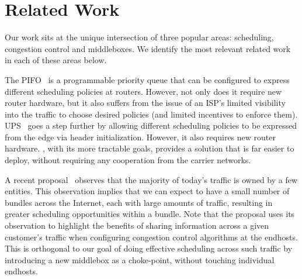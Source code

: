 \section{Related Work}
\label{s:related}

Our work sits at the unique intersection of three popular areas: scheduling, congestion control and middleboxes. We identify the most relevant related work in each of these areas below. 

 The PIFO~\cite{pifo} is a programmable priority queue that can be configured to express different scheduling policies at routers.  However, not only does it require new router hardware, but it also suffers from the issue of an ISP's limited visibility into the traffic to choose desired policies (and limited incentives to enforce them). UPS~\cite{ups} goes a step further by allowing different scheduling policies to be expressed from the edge via header initialization. 
However, it also requires new router hardware. \name, with its more tractable goals, provides a solution that is far easier to deploy, without requiring any cooperation from the carrier networks. 

 A recent proposal~\cite{fivecomps} observes that the majority of today's traffic is owned by a few entities.
This observation implies that we can expect to have a small number of bundles across the Internet, each with large amounts of traffic, resulting in greater scheduling opportunities within a bundle. Note that the proposal uses its observation to highlight the benefits of sharing information across a given customer's traffic when configuring congestion control algorithms at the endhosts. This is orthogonal to our goal of doing effective scheduling across such traffic by introducing a new middlebox as a choke-point, without touching individual endhosts.

